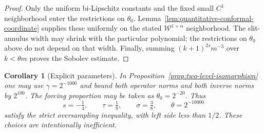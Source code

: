 \documentclass[11pt]{article}
\newtheorem{corollary}[proposition]{Corollary}
\begin{document}
\begin{proof}
Only the uniform bi-Lipschitz constants and the fixed small
$C^1$ neighborhood enter the restrictions on $\theta_0$.
Lemma~\ref{lem:quantitative-conformal-coordinate} supplies these
uniformly on the stated $\mathcal W^{1+\alpha}$ neighborhood.
The slit-annulus width may
shrink with the particular polynomial; the restrictions on
$\theta_0$ above do not depend on that width. Finally, summing
$(k+1)^{2s}m^{-3}$ over $k<\theta m$ proves the Sobolev estimate.
\end{proof}


\begin{corollary}[Explicit parameters]
\label{cor:explicit-neighborhood-parameters}
In Proposition~\ref{prop:two-level-isomorphism} one may use
$\gamma=2^{-1000}$ and bound both operator norms and both inverse
norms by $2^{100}$. The forcing proportion may be taken as
$\theta_0=2^{-20}$. Thus
\[
 s=-\tfrac14,\qquad \tau=\tfrac18,\qquad \sigma=\tfrac38,
 \qquad \theta=2^{-10000}
\]
satisfy the strict oversampling inequality, with left side less
than $1/2$. These choices are intentionally inefficient.
\end{corollary}
\end{document}
